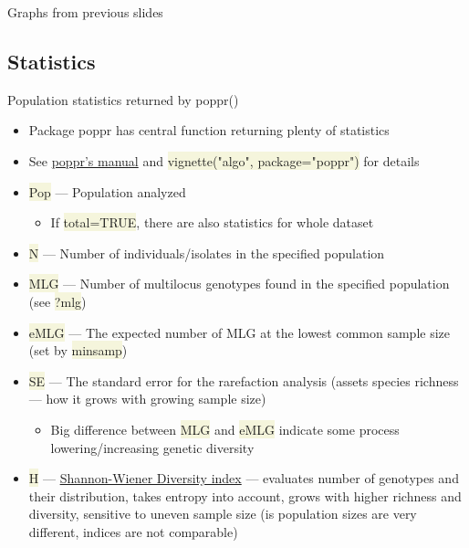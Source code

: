 \documentclass[compress, xelatex, 11pt, xcolor=svgnames, aspectratio=169,
	hyperref={
		bookmarks=true,
		unicode=true,
		colorlinks=true,
		pdftitle={Molecular data in R},
		plainpages=false,
		pdfauthor={Vojtech Zeisek},
		pdfsubject={Course about phylogeny and evolution in R},
		pdfcreator={XeLaTeX},
		pdfkeywords={R, evolution, phylogeny, molecular data},
		linkcolor=Crimson, %
		anchorcolor=Magenta, %
		citecolor=Magenta, %
		filecolor=Magenta, %
		menucolor=Magenta, %
		urlcolor=DodgerBlue, %
		},
	url={hyphens, lowtilde} %
	]{beamer}
\renewcommand{\texttt}[1]{\colorbox{Beige}{{\ttfamily #1}}}
\begin{document}
\begin{frame}{Graphs from previous slides}
	\begin{center}
		\texttt{[image: heterozygosity.png]}
	\end{center}
\end{frame}

\subsection{Statistics}

\begin{frame}[allowframebreaks]{Population statistics returned by poppr()}
	\begin{itemize}
		\item Package poppr has central function returning plenty of statistics
		\item See \href{https://grunwaldlab.github.io/Population_Genetics_in_R/}{poppr's manual} and \texttt{vignette("algo", package="poppr")} for details
		\item \texttt{Pop} --- Population analyzed
		\begin{itemize}
			\item If \texttt{total=TRUE}, there are also statistics for whole dataset
		\end{itemize}
		\item \texttt{N} --- Number of individuals/isolates in the specified population
		\item \texttt{MLG} --- Number of multilocus genotypes found in the specified population (see \texttt{?mlg})
		\item \texttt{eMLG} --- The expected number of MLG at the lowest common sample size (set by \texttt{minsamp})
		\item \texttt{SE} --- The standard error for the rarefaction analysis (assets species richness --- how it grows with growing sample size)
		\begin{itemize}
			\item Big difference between \texttt{MLG} and \texttt{eMLG} indicate some process lowering/increasing genetic diversity
		\end{itemize}
		\item \texttt{H} --- \href{https://en.wikipedia.org/wiki/Diversity_index\#Shannon_index}{Shannon-Wiener Diversity index} --- evaluates number of genotypes and their distribution, takes entropy into account, grows with higher richness and diversity, sensitive to uneven sample size (is population sizes are very different, indices are not comparable)

\end{itemize}
\end{frame}
\end{document}
